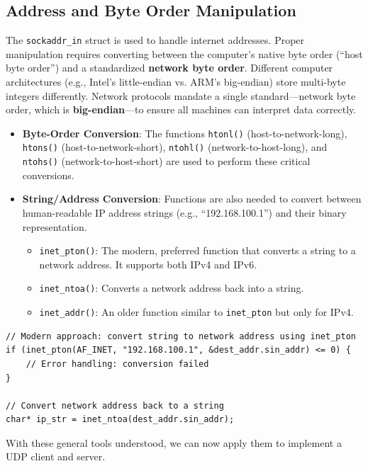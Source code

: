 \documentclass{article}
\begin{document}
\subsection{Address and Byte Order Manipulation}

The \texttt{sockaddr\_in} struct is used to handle internet addresses. Proper manipulation requires converting between the computer's native byte order (``host byte order'') and a standardized \textbf{network byte order}. Different computer architectures (e.g., Intel's little-endian vs. ARM's big-endian) store multi-byte integers differently. Network protocols mandate a single standard---network byte order, which is \textbf{big-endian}---to ensure all machines can interpret data correctly.

\begin{itemize}
    \item \textbf{Byte-Order Conversion}: The functions \texttt{htonl()} (host-to-network-long), \texttt{htons()} (host-to-network-short), \texttt{ntohl()} (network-to-host-long), and \texttt{ntohs()} (network-to-host-short) are used to perform these critical conversions.
    \item \textbf{String/Address Conversion}: Functions are also needed to convert between human-readable IP address strings (e.g., ``192.168.100.1'') and their binary representation.
    \begin{itemize}
        \item \texttt{inet\_pton()}: The modern, preferred function that converts a string to a network address. It supports both IPv4 and IPv6.
        \item \texttt{inet\_ntoa()}: Converts a network address back into a string.
        \item \texttt{inet\_addr()}: An older function similar to \texttt{inet\_pton} but only for IPv4.
    \end{itemize}
\end{itemize}

\begin{verbatim}
// Modern approach: convert string to network address using inet_pton
if (inet_pton(AF_INET, "192.168.100.1", &dest_addr.sin_addr) <= 0) {
    // Error handling: conversion failed
}

// Convert network address back to a string
char* ip_str = inet_ntoa(dest_addr.sin_addr);
\end{verbatim}

With these general tools understood, we can now apply them to implement a UDP client and server.
\end{document}
